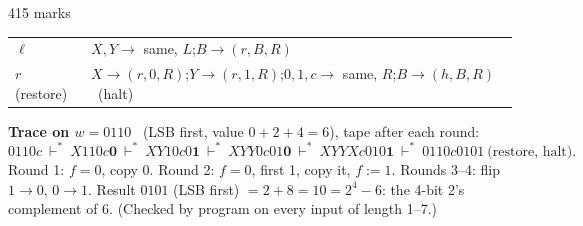 \documentclass[10.5pt,a4paper]{article}
\newcommand{\ansh}[1]{\textbf{\color{exborder}#1}\ }
\begin{document}
\begin{qa}{4}{15 marks}
\begin{center}
\begin{tabular}{@{}l|>{\raggedright\arraybackslash}p{13.2cm}@{}}
$\ell$ & $X,Y\to$ same, $L$;\quad $B\to(r,B,R)$\\
$r$ (restore) & $X\to(r,0,R)$;\quad $Y\to(r,1,R)$;\quad $0,1,c\to$ same, $R$;\quad $B\to(h,B,R)$ \ (halt)\\\bottomrule
\end{tabular}
\end{center}
\ansh{Trace on $w=0110$} (LSB first, value $0+2+4=6$), tape after each round:
\[0110c\ \vdash^*\ X110c\mathbf0\ \vdash^*\ XY10c0\mathbf1\ \vdash^*\ XYY0c01\mathbf0\ \vdash^*\ XYYXc010\mathbf1\ \vdash^*\ 0110c0101\ \text{(restore, halt)}.\]
Round 1: $f=0$, copy 0. Round 2: $f=0$, first 1, copy it, $f:=1$. Rounds 3--4: flip $1\to0$, $0\to1$.
Result $0101$ (LSB first) $=2+8=10=2^4-6$: the 4-bit 2's complement of 6. (Checked by program on every input of length 1--7.)
\end{qa}
\end{document}
